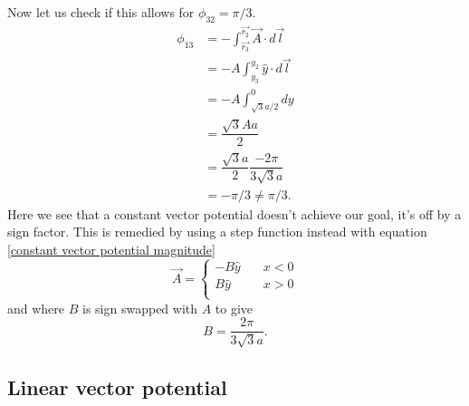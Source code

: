 Now let us check if this allows for $\phi_{32} = \pi/3$.
\begin{align}
  \phi_{13} &= -\int_{\vec{r_3}}^{\vec{r_2}} \vec{A} \cdot d\vec{l} \nonumber \\
  &= -A \int_{y_3}^{y_2} \hat{y} \cdot d\vec{l} \nonumber \\
  &= -A \int_{\sqrt{3}a/2}^0 dy \nonumber \\
  &= \dfrac{\sqrt{3} A a}{2} \nonumber \\
  &= \dfrac{\sqrt{3} a}{2} \dfrac{-2 \pi}{3 \sqrt{3} a} \nonumber \\
  &= -\pi/3 \neq \pi/3. \nonumber
\end{align}
Here we see that a constant vector potential doesn't achieve our goal, it's off by a sign factor.
This is remedied by using a step function instead with equation \ref{constant vector potential magnitude}
\begin{equation*}
  \vec{A} = \begin{cases}
              -B \hat{y} \quad &x < 0 \\
              B \hat{y} \quad &x > 0 \\
            \end{cases}
\end{equation*}
and where $B$ is sign swapped with $A$ to give
\begin{equation}
  B = \dfrac{2 \pi}{3 \sqrt{3} a}.
\end{equation}
\subsection{Linear vector potential}

